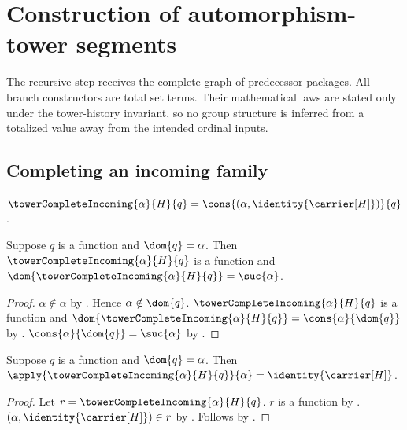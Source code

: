 




\section{Construction of automorphism-tower segments}

The recursive step receives the complete graph of predecessor packages.  All
branch constructors are total set terms.  Their mathematical laws are stated
only under the tower-history invariant, so no group structure is inferred
from a totalized value away from the intended ordinal inputs.

\subsection{Completing an incoming family}

\begin{definition}\label{tower_complete_incoming}
    $\towerCompleteIncoming{\alpha}{H}{q}=
        \cons{(\alpha,\identity{\carrier[H]})}{q}$.
\end{definition}

\begin{proposition}\label{tower_complete_incoming_function}
    Suppose $q$ is a function and $\dom{q}=\alpha$.
    Then $\towerCompleteIncoming{\alpha}{H}{q}$ is a function and
        $\dom{\towerCompleteIncoming{\alpha}{H}{q}}=\suc{\alpha}$.
\end{proposition}
\begin{proof}
    $\alpha\notin\alpha$ by .
    Hence $\alpha\notin\dom{q}$.
    $\towerCompleteIncoming{\alpha}{H}{q}$ is a function and
        $\dom{\towerCompleteIncoming{\alpha}{H}{q}}=
            \cons{\alpha}{\dom{q}}$ by
        .
    $\cons{\alpha}{\dom{q}}=\suc{\alpha}$ by
        .
\end{proof}

\begin{proposition}\label{tower_complete_incoming_current}
    Suppose $q$ is a function and $\dom{q}=\alpha$.
    Then $\apply{\towerCompleteIncoming{\alpha}{H}{q}}{\alpha}=
        \identity{\carrier[H]}$.
\end{proposition}
\begin{proof}
    Let $r=\towerCompleteIncoming{\alpha}{H}{q}$.
    $r$ is a function by
        .
    $(\alpha,\identity{\carrier[H]})\in r$ by
        .
    Follows by .
\end{proof}

